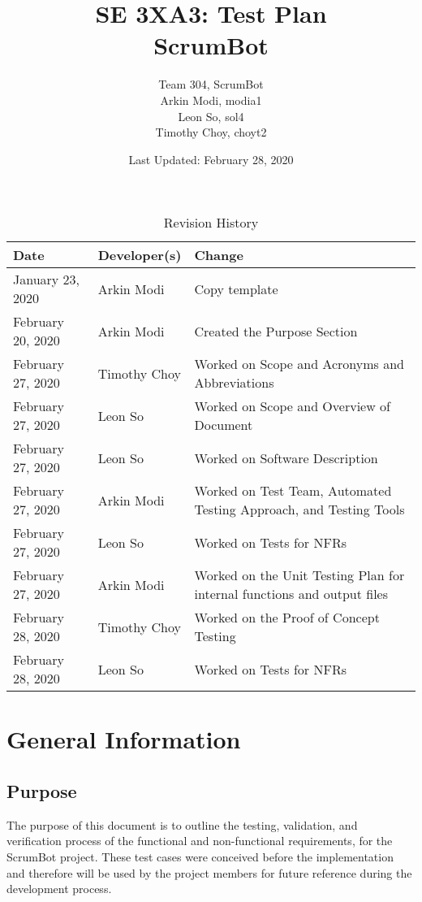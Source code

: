 \documentclass[12pt, titlepage]{article}
\title{SE 3XA3: Test Plan\\ScrumBot}
\author{
	Team 304, ScrumBot
		\\ Arkin Modi, modia1
        \\ Leon So, sol4
        \\ Timothy Choy, choyt2
}
\date{Last Updated: February 28, 2020}
\begin{document}
\newpage
\maketitle

\tableofcontents
\listoftables
\listoffigures

\newpage

\begin{table}[!hbp]
    \caption{Revision History} \label{TblRevisionHistory}
    \begin{tabularx}{\textwidth}{llX}
        \toprule
            \textbf{Date} & \textbf{Developer(s)} & \textbf{Change}\\
        \midrule
            January 23, 2020 & Arkin Modi & Copy template\\
            February 20, 2020 & Arkin Modi & Created the Purpose Section\\
            February 27, 2020 & Timothy Choy & Worked on Scope and Acronyms and Abbreviations\\
            February 27, 2020 & Leon So & Worked on Scope and Overview of Document\\
            February 27, 2020 & Leon So & Worked on Software Description\\
            February 27, 2020 & Arkin Modi & Worked on Test Team, Automated Testing Approach, and Testing Tools\\
            February 27, 2020 & Leon So & Worked on Tests for NFRs\\
            February 27, 2020 & Arkin Modi & Worked on the Unit Testing Plan for internal functions and output files\\
            February 28, 2020 & Timothy Choy & Worked on the Proof of Concept Testing\\
            February 28, 2020 & Leon So & Worked on Tests for NFRs\\
        \bottomrule
    \end{tabularx}
\end{table}


\newpage


\section{General Information}

\subsection{Purpose}
The purpose of this document is to outline the testing, validation, and verification process of the functional and non-functional requirements, for the ScrumBot project. These test cases were conceived before the implementation and therefore will be used by the project members for future reference during the development process.
\end{document}
